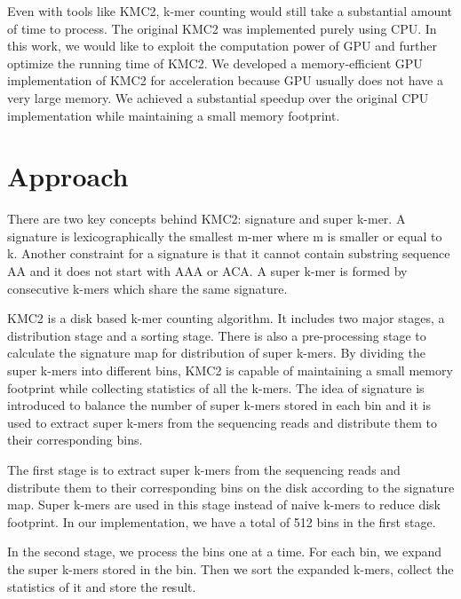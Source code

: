 \documentclass{bioinfo}
\begin{document}
Even with tools like KMC2, k-mer counting would still take a substantial amount of time to
process. The original KMC2 was implemented purely using CPU.
In this work, we would like to exploit the computation power of GPU and further optimize
the running time of KMC2. We developed a memory-efficient GPU implementation of KMC2 for
acceleration because GPU usually does not have a very large memory.
We achieved a substantial speedup over the original CPU implementation while maintaining a
small memory footprint.

\section{Approach}
There are two key concepts behind KMC2: signature and super k-mer.
A signature is lexicographically the smallest m-mer where m is smaller or equal to k.
Another constraint for a signature is that it cannot contain substring sequence AA and it
does not start with AAA or ACA.
A super k-mer is formed by consecutive k-mers which share the same signature.

KMC2 is a disk based k-mer counting algorithm. It includes two major stages, a
distribution stage and a sorting stage. There is also a pre-processing stage to calculate
the signature map for distribution of super k-mers. By dividing the super k-mers into
different bins, KMC2 is capable of maintaining a small memory footprint while collecting
statistics of all the k-mers.
The idea of signature is introduced to balance the number of super k-mers stored in each
bin and it is used to extract super k-mers from the sequencing reads and distribute them
to their corresponding bins.

The first stage is to extract super k-mers from the sequencing reads and distribute them
to their corresponding bins on the disk according to the signature map.
Super k-mers are used in this stage instead of naive k-mers to reduce disk footprint.
In our implementation, we have a total of 512 bins in the first stage.

In the second stage, we process the bins one at a time. For each bin, we expand the super
k-mers stored in the bin. Then we sort the expanded k-mers, collect the statistics of it
and store the result.
\end{document}

